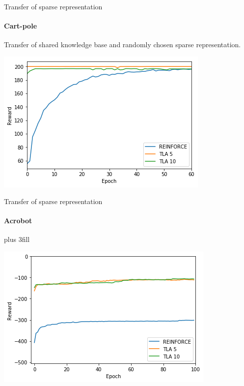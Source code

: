 \begin{frame}[fragile]{Transfer of sparse representation}
\framesubtitle{Cart-pole}
Transfer of shared knowledge base and randomly chosen sparse representation.
\begin{center}
    \includegraphics[width=.8\linewidth]{results/CartPole/sparse_transfer/reward_target_re-akt5-akt10.png}
\end{center}
\end{frame}

\begin{frame}[fragile]{Transfer of sparse representation}
\framesubtitle{Acrobot}
\vskip0pt plus 3fill
\begin{center}
    \includegraphics[width=.8\linewidth]{results/Acrobot/sparse_transfer/reward_target_re-akt5-akt10.png}
\end{center}
\end{frame}

